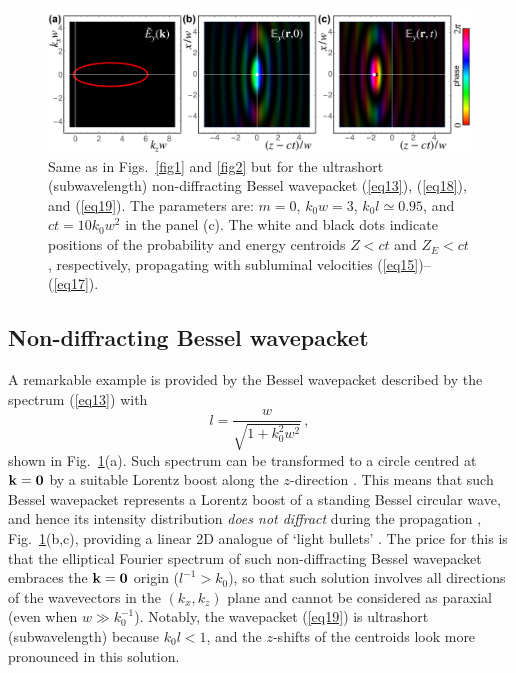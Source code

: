 \documentclass[12pt, a4paper, superscriptaddress, final]{iopart}
\begin{document}
\begin{figure}[!t]
\includegraphics[width=\linewidth]{Fig_3.jpg}
\caption{Same as in Figs.~\ref{fig1} and \ref{fig2} but for the ultrashort (subwavelength) non-diffracting Bessel wavepacket (\ref{eq13}), (\ref{eq18}), and (\ref{eq19}). The parameters are: $m=0$, $k_0 w =3$, $k_0 l \simeq 0.95$, and $ct = 10 k_0 w^2$ in the panel (c). The white and black dots indicate positions of the probability and energy centroids $Z <ct$ and $Z_E <ct$, respectively, propagating with subluminal velocities (\ref{eq15})--(\ref{eq17}).}
\label{fig3}
\end{figure}

\subsection{Non-diffracting Bessel wavepacket}

A remarkable example is provided by the Bessel wavepacket described by the spectrum (\ref{eq13}) with 
%
\begin{equation}
\label{eq19}
l=\frac{w}{\sqrt{1+k_0^2 w^2}}\,,
 \end{equation}
%
shown in Fig.~\ref{fig3}(a). Such spectrum can be transformed to a circle centred at ${\bf k}={\bf 0}$ by a suitable Lorentz boost along the $z$-direction \cite{Bliokh2012,Bliokh2021}. This means that such Bessel wavepacket represents a Lorentz boost of a standing Bessel circular wave, and hence its intensity distribution {\it does not diffract} during the propagation \cite{Bliokh2012,Bliokh2021}, Fig.~\ref{fig3}(b,c), providing a linear 2D analogue of `light bullets' \cite{Silberberg1990,Minardi2010}. The price for this is that the elliptical Fourier spectrum of such non-diffracting Bessel wavepacket embraces the ${\bf k}={\bf 0}$ origin ($l^{-1} > k_0$), so that such solution involves all directions of the wavevectors in the $(k_x,k_z)$ plane and cannot be considered as paraxial (even when $w \gg k_0^{-1}$). Notably, the wavepacket (\ref{eq19}) is ultrashort (subwavelength) because $k_0 l < 1$, and the $z$-shifts of the centroids look more pronounced in this solution.
\end{document}
